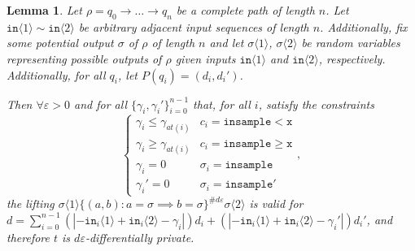 \documentclass[12pt]{article}
\newcommand{\gguard}[1][x]{\texttt{insample}\geq #1}
\newcommand{\lguard}[1][x]{\texttt{insample} < #1}
\newcommand{\brangle}[1]{\langle #1 \rangle}
\newtheorem{lemma}[thm]{Lemma}
\theoremstyle{definition}
\begin{document}
\begin{lemma}\label{multTransitionsCouplingProof}
    Let $\rho = q_0\to \ldots \to q_n$ be a complete path of length $n$. 
    Let $\texttt{in}\brangle{1}\sim \texttt{in}\brangle{2}$ be arbitrary adjacent input sequences of length $n$. Additionally, fix some potential output $\sigma$ of $\rho$ of length $n$ and let $\sigma\brangle{1}$, $\sigma\brangle{2}$ be random variables representing possible outputs of $\rho$ given inputs $\texttt{in}\brangle{1}$ and $\texttt{in}\brangle{2}$, respectively. Additionally, for all $q_i$, let $P(q_i) = (d_i, d_i')$.

    Then $\forall \varepsilon>0$ and for all $\{\gamma_i, \gamma_i'\}_{i=0}^{n-1}$ that, for all $i$, satisfy the constraints \[
        \begin{cases}
          \gamma_i\leq\gamma_{at(i)} & c_i = \lguard[\texttt{x}]\\
          \gamma_i\geq\gamma_{at(i)} & c_i = \gguard[\texttt{x}]\\
          \gamma_i=0 & \sigma_i = \texttt{insample}\\
          \gamma_i'=0 & \sigma_i = \texttt{insample}'
        \end{cases},
      \]
      the lifting $\sigma\brangle{1}\{(a, b): a=\sigma\implies b=\sigma\}^{\#d\varepsilon}\sigma\brangle{2}$ is valid for $d = \sum_{i=0}^{n-1}(|-\texttt{in}_i\brangle{1}+\texttt{in}_i\brangle{2}-\gamma_i|)d_i+(|-\texttt{in}_i\brangle{1}+\texttt{in}_i\brangle{2}-\gamma_i'|)d_i'$, and therefore $t$ is $d\varepsilon$-differentially private. 
\end{lemma}
\end{document}
